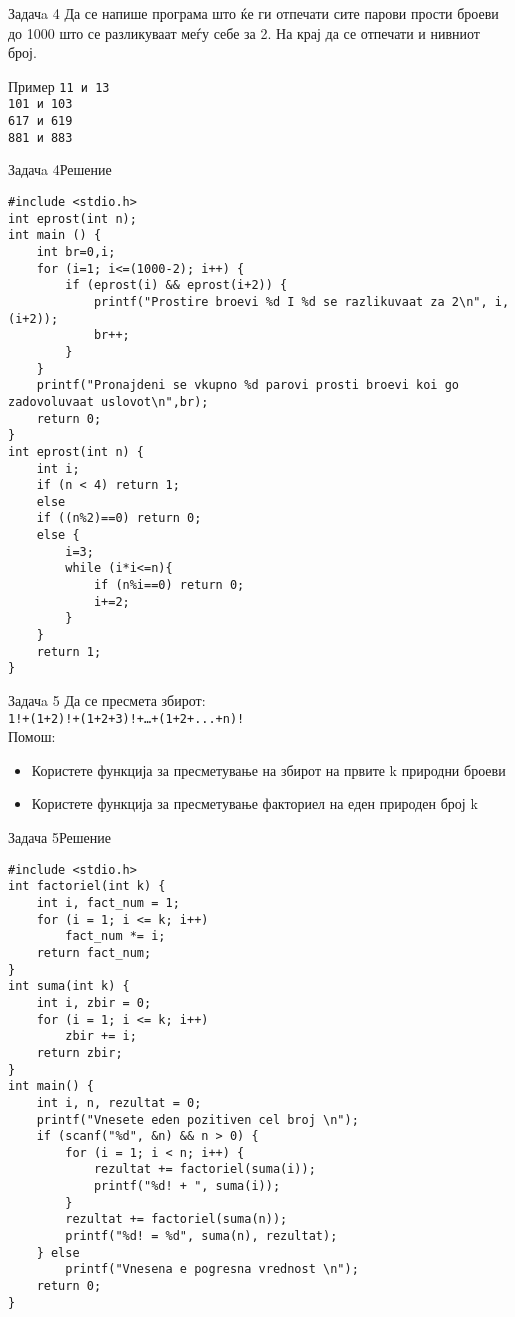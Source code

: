 \begin{frame}{Задачa 4}
Да се напише програма што ќе ги отпечати сите парови прости броеви до 1000 што
се разликуваат меѓу себе за 2. На крај да се отпечати и нивниот број.
\begin{exampleblock}{Пример}
\texttt{11 и 13}\\
\texttt{101 и 103}\\
\texttt{617 и 619}\\
\texttt{881 и 883}
\end{exampleblock}
\end{frame}

\begin{frame}[fragile]{Задачa 4}{Решение}
\begin{lstlisting}
#include <stdio.h>
int eprost(int n);
int main () {
    int br=0,i;
    for (i=1; i<=(1000-2); i++) {
        if (eprost(i) && eprost(i+2)) {
            printf("Prostire broevi %d I %d se razlikuvaat za 2\n", i, (i+2));
            br++;
        }
    }
    printf("Pronajdeni se vkupno %d parovi prosti broevi koi go zadovoluvaat uslovot\n",br);
    return 0;
}
int eprost(int n) {
    int i;
    if (n < 4) return 1;
    else
    if ((n%2)==0) return 0;
    else {
        i=3;
        while (i*i<=n){
            if (n%i==0) return 0;
            i+=2;
        }
    }
    return 1;
} 
\end{lstlisting}
\end{frame}

\begin{frame}{Задачa 5}
Да се пресмета збирот:\\
\texttt{1!+(1+2)!+(1+2+3)!+\ldots+(1+2+...+n)!}
\\Помош:\\
\begin{itemize}
    \item Користете функција за пресметување на збирот на првите k природни
  броеви
    \item Користете функција за пресметување факториел на еден природен број k
\end{itemize}
\end{frame}

\begin{frame}[fragile]{Задача 5}{Решение}
\begin{lstlisting}
#include <stdio.h>
int factoriel(int k) {
    int i, fact_num = 1;
    for (i = 1; i <= k; i++)
        fact_num *= i;
    return fact_num;
}
int suma(int k) {
    int i, zbir = 0;
    for (i = 1; i <= k; i++)
        zbir += i;
    return zbir;
}
int main() {
    int i, n, rezultat = 0;
    printf("Vnesete eden pozitiven cel broj \n");
    if (scanf("%d", &n) && n > 0) {
        for (i = 1; i < n; i++) {
            rezultat += factoriel(suma(i));
            printf("%d! + ", suma(i));
        }
        rezultat += factoriel(suma(n));
        printf("%d! = %d", suma(n), rezultat);
    } else
        printf("Vnesena e pogresna vrednost \n");
    return 0;
}
\end{lstlisting}
\end{frame}

